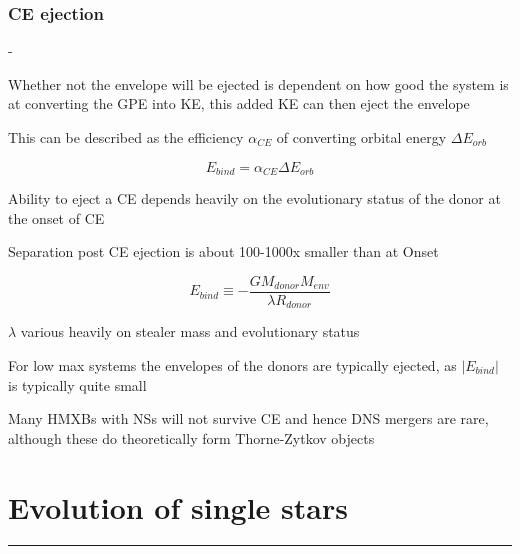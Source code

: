 \subsection{CE ejection}
\begin{list}{-}{}
\item Whether not the envelope will be ejected is dependent on how good the system is at converting the GPE into KE, this added KE can then eject the envelope 
\item This can be described as the efficiency \(\alpha_{CE}\) of converting orbital energy \(\Delta E_{orb}\)
\item \[E_{bind} = \alpha_{CE}\Delta E_{orb}\] 
\item Ability to eject a CE depends heavily on the evolutionary status of the donor at the onset of CE
\item Separation post CE ejection is about 100-1000x smaller than at Onset
\item \[E_{bind} \equiv -\frac{GM_{donor} M_{env}}{\lambda R_{donor}}\]
\item \(\lambda\) various heavily on stealer mass and evolutionary status
\item For low max systems the envelopes of the donors are typically ejected, as \(|E_{bind}|\) is typically quite small
\item Many HMXBs with NSs will not survive CE and hence DNS mergers are rare, although these do theoretically form Thorne-Zytkov objects
\item 
\end{list}


\pagebreak
\setcounter{section}{7}
\chapter{Evolution of single stars}
\hrule
\vspace{.5cm}

